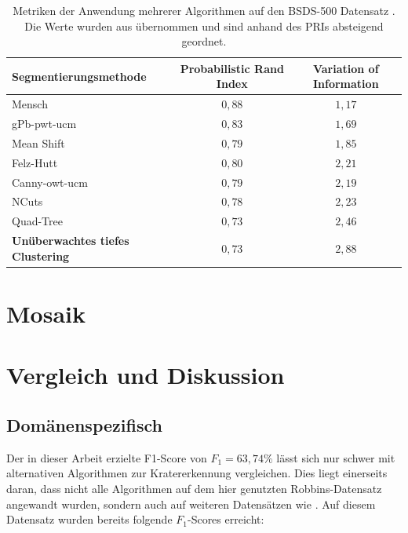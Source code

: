 \begin{table}
	\begin{tabular}{l c c}
		\toprule
		\textbf{Segmentierungsmethode} & \textbf{Probabilistic Rand Index} & \textbf{Variation of Information} \\
		\midrule
		Mensch \cite{bsd500} & $0,88$ & $1,17$ \\
		\midrule
		gPb-pwt-ucm \cite{arbelaez_10} & $0,83$ & $1,69$ \\
		Mean Shift \cite{comaniciu_02} & $0,79$ & $1,85$ \\
		Felz-Hutt \cite{felzenszwalb_04} & $0,80$ & $2,21$ \\
		Canny-owt-ucm \cite{arbelaez_10} & $0,79$ & $2,19$ \\
		NCuts \cite{cour_05} & $0,78$ & $2,23$ \\
		Quad-Tree & $0,73$ & $2,46$ \\
		\textbf{Unüberwachtes tiefes Clustering} & $0,73$ & $2,88$ \\
		\bottomrule
	\end{tabular}
	\caption{Metriken der Anwendung mehrerer Algorithmen auf den BSDS-500 Datensatz \cite{bsd500}. Die Werte wurden aus \cite{arbelaez_10} übernommen und sind anhand des PRIs absteigend geordnet.}
	\label{tab:res_bsds500}
\end{table}

\section{Mosaik}
\label{sec:mosaic}

\section{Vergleich und Diskussion}
\label{sec:discussion}

\subsection{Domänenspezifisch}

Der in dieser Arbeit erzielte F1-Score von $F_1=63,74\%$ lässt sich nur schwer mit alternativen Algorithmen zur Kratererkennung vergleichen. Dies liegt einerseits daran, dass nicht alle Algorithmen auf dem hier genutzten Robbins-Datensatz \cite{robbins_12} angewandt wurden, sondern auch auf weiteren Datensätzen wie \cite{bandeira_10}. Auf diesem Datensatz wurden bereits folgende $F_1$-Scores erreicht:

